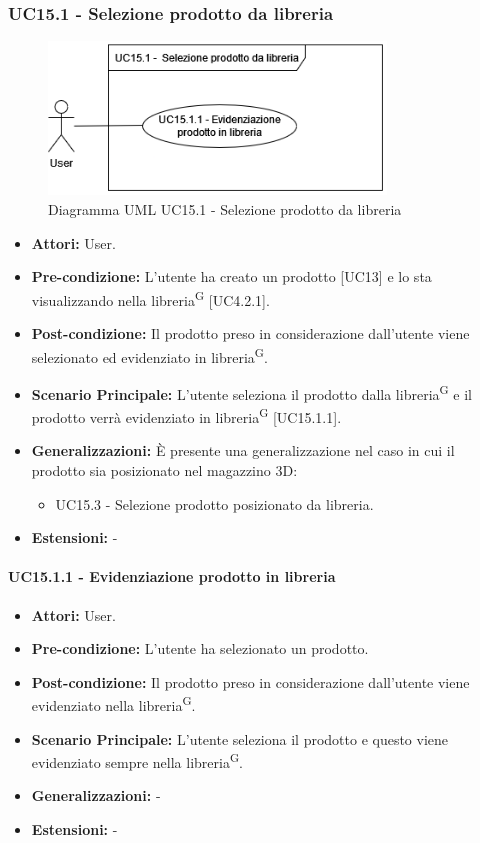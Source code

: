 \subsubsection{UC15.1 - Selezione prodotto da libreria}
\begin{figure}[H]
  \centering
  \includegraphics[width=0.8\textwidth]{UC_diagrams_11-20/UC15.1.drawio.png}
   \caption{Diagramma UML UC15.1 - Selezione prodotto da libreria}
\end{figure}
\begin{itemize}
    \item \textbf{Attori:} User.
    \item \textbf{Pre-condizione:}  L'utente ha creato un prodotto [UC13] e lo sta visualizzando nella libreria\textsuperscript{G} [UC4.2.1].
    \item \textbf{Post-condizione:} Il prodotto preso in considerazione dall'utente viene selezionato ed evidenziato in libreria\textsuperscript{G}.
    \item \textbf{Scenario Principale:} L'utente seleziona il prodotto dalla libreria\textsuperscript{G} e il prodotto verrà evidenziato in libreria\textsuperscript{G} [UC15.1.1].
    \item \textbf{Generalizzazioni:} È presente una generalizzazione nel caso in cui il prodotto sia posizionato nel magazzino 3D:
    \begin{itemize}
        \item UC15.3 - Selezione prodotto posizionato da libreria.
    \end{itemize}
    \item \textbf{Estensioni:} -
\end{itemize}


\paragraph{UC15.1.1 - Evidenziazione prodotto in libreria}
\begin{itemize}
    \item \textbf{Attori:} User.
    \item \textbf{Pre-condizione:}  L'utente ha selezionato un prodotto.
    \item \textbf{Post-condizione:} Il prodotto preso in considerazione dall'utente viene evidenziato nella libreria\textsuperscript{G}.
    \item \textbf{Scenario Principale:} L'utente seleziona il prodotto e questo viene evidenziato sempre nella libreria\textsuperscript{G}.
    \item \textbf{Generalizzazioni:} -
    \item \textbf{Estensioni:} -
\end{itemize}


